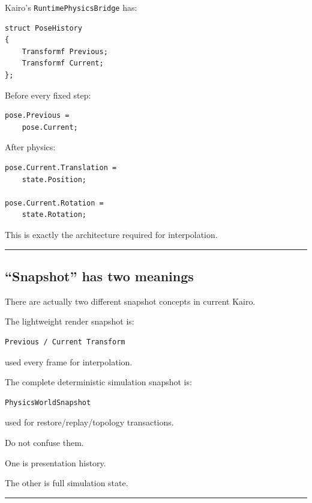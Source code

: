 Kairo's \texttt{RuntimePhysicsBridge} has:

\begin{verbatim}
struct PoseHistory
{
    Transformf Previous;
    Transformf Current;
};
\end{verbatim}

Before every fixed step:

\begin{verbatim}
pose.Previous =
    pose.Current;
\end{verbatim}

After physics:

\begin{verbatim}
pose.Current.Translation =
    state.Position;

pose.Current.Rotation =
    state.Rotation;
\end{verbatim}

This is exactly the architecture required for interpolation.

\begin{center}\rule{0.5\linewidth}{0.5pt}\end{center}

\subsection{``Snapshot'' has two meanings}\label{06-engine-ii-ch037-snapshot-has-two-meanings}

\hypertarget{06-engine-ii-ch037-snapshot-has-two-meanings}{}

There are actually two different snapshot concepts in current Kairo.

The lightweight render snapshot is:

\begin{verbatim}
Previous / Current Transform
\end{verbatim}

used every frame for interpolation.

The complete deterministic simulation snapshot is:

\begin{verbatim}
PhysicsWorldSnapshot
\end{verbatim}

used for restore/replay/topology transactions.

Do not confuse them.

One is presentation history.

The other is full simulation state.

\begin{center}\rule{0.5\linewidth}{0.5pt}\end{center}


